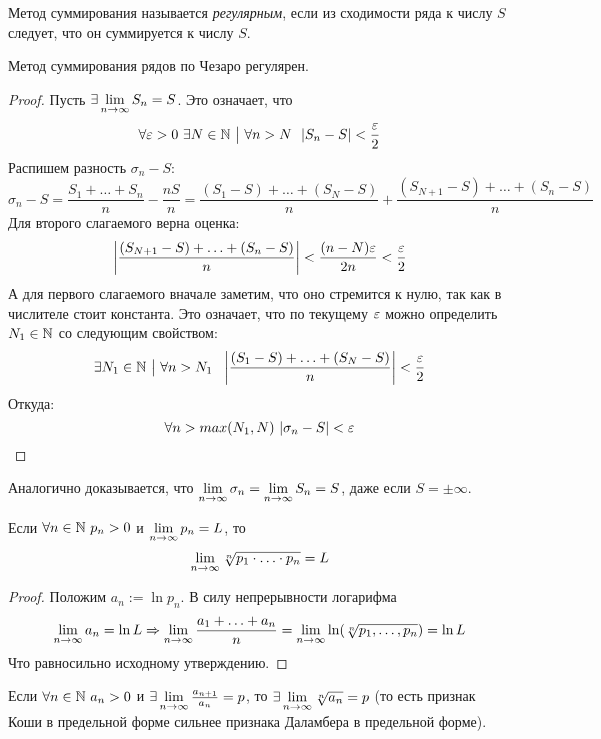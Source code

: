 \begin{definition}
	Метод суммирования называется \textit{регулярным}, если из сходимости ряда к числу $S$ следует, что он суммируется к числу $S$.
\end{definition}

\begin{theorem}
	Метод суммирования рядов по Чезаро регулярен.
\end{theorem}

\begin{proof}
	Пусть $\exists \lim\limits_{n \to \infty} S_n = S$. Это означает, что
	\[
		\forall \varepsilon > 0\ \exists N \in \mathbb{N} \ \big|\  \forall n > N\ \ |S_n - S| < \frac{\varepsilon}{2}
	\]
	Распишем разность $\sigma_n - S$:
	\[
		\sigma_n - S = \frac{S_1 + \ldots + S_n}{n} - \frac{nS}{n} = \frac{(S_1 - S) + \ldots + (S_N - S)}{n} + \frac{(S_{N + 1} - S) + \ldots + (S_n - S)}{n}
	\]
	Для второго слагаемого верна оценка:
	\[
		\left|\frac{(S_{N + 1} - S) + \ldots + (S_n - S)}{n}\right| < \frac{(n - N)\varepsilon}{2n} < \frac{\varepsilon}{2}
	\]
	А для первого слагаемого вначале заметим, что оно стремится к нулю, так как в числителе стоит константа. Это означает, что по текущему $\varepsilon$ можно определить $N_1 \in \mathbb{N}$ со следующим свойством:
	\[
		\exists N_1 \in \N \such \forall n > N_1\ \ \left|\frac{(S_1 - S) + \ldots + (S_N - S)}{n}\right| < \frac{\eps}{2}
	\]
	Откуда:
	\[
		\forall n > max(N_1, N)\ |\sigma_n - S| < \varepsilon
	\]
\end{proof}

\begin{note}
	Аналогично доказывается, что $\lim\limits_{n \to \infty} \sigma_n = \lim\limits_{n \to \infty} S_n = S$, даже если $S = \pm \infty$.
\end{note}

\begin{corollary}
	Если $\forall n \in \mathbb{N}\ p_n > 0$ и $\lim\limits_{n \to \infty} p_n = L$, то
	\[
		\lim\limits_{n \to \infty} \sqrt[n]{p_1 \cdot \ldots \cdot p_n} = L
	\]
\end{corollary}

\begin{proof}
	Положим $a_n := \ln p_n$. В силу непрерывности логарифма
	\[
		\lim\limits_{n \to \infty} a_n = \ln L \Rightarrow \lim\limits_{n \to \infty} \frac{a_1 + \ldots + a_n}{n} = \lim\limits_{n \to \infty} \ln (\sqrt[n]{p_1, \ldots, p_n}) = \ln L
	\]
	Что равносильно исходному утверждению.
\end{proof}

\begin{corollary}
	Если $\forall n \in \mathbb{N}\ a_n > 0$ и $\exists \lim\limits_{n \to \infty} \frac{a_{n + 1}}{a_n} = p$, то $\exists \lim\limits_{n \to \infty} \sqrt[n]{a_n} = p$ (то есть признак Коши в предельной форме сильнее признака Даламбера в предельной форме).
\end{corollary}

